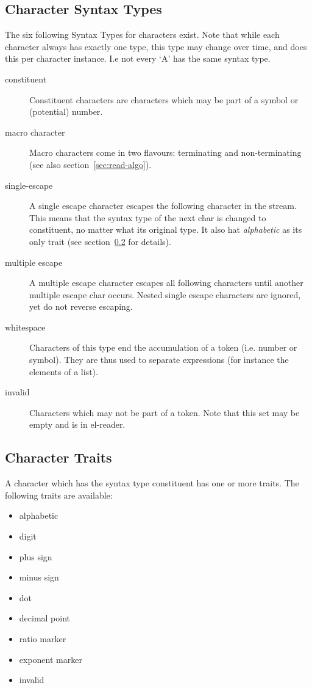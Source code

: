 \documentclass[a4paper,10pt,twoside]{report}
\newcommand{\elr}{el-reader}
\begin{document}
\subsection{Character Syntax Types}
\label{subsubsec:syntax-type}

The six following Syntax Types for characters exist.  Note that while each
character always has exactly one type, this type may change over time, and does
this per character instance.  I.e not every `A' has the same syntax type.

\begin{description}
\item[constituent] Constituent characters are characters which may be part of a
  symbol or (potential) number.
\item[macro character] Macro characters come in two flavours: terminating and
  non-terminating (see also section~\ref{sec:read-algo}).
\item[single-escape] A single escape character escapes the following character
  in the stream.  This means that the syntax type of the next char is changed to
  constituent, no matter what its original type.  It also hat \emph{alphabetic}
  as its only trait (see section~\ref{subsubsec:traits} for details).
\item[multiple escape] A multiple escape character escapes all following
  characters until another multiple escape char occurs.  Nested single escape
  characters are ignored, yet do not reverse escaping.
\item[whitespace] Characters of this type end the accumulation of a token
  (i.e. number or symbol).  They are thus used to separate expressions (for
  instance the elements of a list).
\item[invalid] Characters which may not be part of a token.  Note that this set
  may be empty and is in \elr{}.
\end{description}

\subsection{Character Traits}
\label{subsubsec:traits}

A character which has the syntax type constituent has one or more traits.
The following traits are available:

\begin{itemize}
\item alphabetic
\item digit
\item plus sign
\item minus sign
\item dot
\item decimal point
\item ratio marker
\item exponent marker
\item invalid
\end{itemize}
\end{document}
